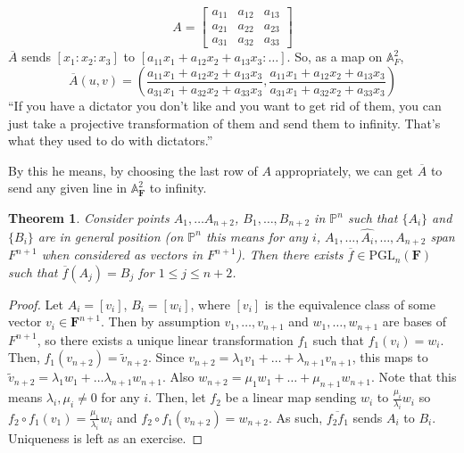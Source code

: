 \documentclass[12pt]{article}
\newcommand{\F}{\mathbf{F}}
\renewcommand{\P}{\mathbb{P}}
\newcommand{\A}{\mathbb{A}}
\newcommand{\PGL}{\mathrm{PGL}}
\newtheorem{theorem}{Theorem}
\begin{document}
    $$A = \begin{bmatrix}
        a_{11} & a_{12} & a_{13} \\
        a_{21} & a_{22} & a_{23} \\
        a_{31} & a_{32} & a_{33}
    \end{bmatrix}$$
    $\overline{A}$ sends $[x_1: x_2: x_3]$ to $[a_{11}x_1 + a_{12}x_2 + a_{13}x_3: \dots]$. So, as a map on $\A_F^2$, 
    $$\overline{A}(u, v) =  \left( \frac{a_{11}x_1 + a_{12}x_2 + a_{13}x_3}{a_{31}x_1 + a_{32}x_2 + a_{33}x_3}, \frac{a_{11}x_1 + a_{12}x_2 + a_{13}x_3}{a_{31}x_1 + a_{32}x_2 + a_{33}x_3}\right)$$
    ``If you have a dictator you don't like and you want to get rid of them, you can just take a projective transformation of them and send them to infinity. That's what they used to do with dictators.'' \par
    By this he means, by choosing the last row of $A$ appropriately, we can get $\overline{A}$ to send any given line in $\A_\F^2$ to infinity. 
    \begin{theorem}
        Consider points $A_1, \dots A_{n+2}$, $B_1, \dots, B_{n+2}$ in $\P^n$ such that $\{A_i\}$ and $\{B_i\}$ are in \textit{general position} (on $\P^n$ this means for any $i$, $A_1, \dots, \hat{A_i}, \dots, A_{n+2}$ span $F^{n+1}$ when considered as vectors in $F^{n+1}$). Then there exists $\overline{f} \in \PGL_n(\F)$ such that $\overline{f}(A_j) = B_j$ for $1 \leq j \leq n+2$. 
    \end{theorem}
    \begin{proof}
        Let $A_i = [v_i]$, $B_i = [w_i]$, where $[v_i]$ is the equivalence class of some vector $v_i \in \F^{n+1}$. Then by assumption $v_1, \dots, v_{n+1}$ and $w_1, \dots, w_{n+1}$ are bases of $F^{n+1}$, so there exists a unique linear transformation $f_1$ such that $f_1(v_i) = w_i$. Then, $f_1(v_{n+2}) = \tilde{v}_{n+2}$. Since $v_{n+2} = \lambda_1v_1 + \dots + \lambda_{n+1}v_{n+1}$, this maps to $\tilde{v}_{n+2} = \lambda_1w_1 + \dots \lambda_{n+1}w_{n+1}$. Also $w_{n+2} = \mu_1w_1 + \dots + \mu_{n+1}w_{n+1}$. Note that this means $\lambda_i, \mu_i \neq 0$ for any $i$. Then, let $f_2$ be a linear map sending $w_i$ to $\frac{\mu_i}{\lambda_i}w_i$ so $f_2 \circ f_1(v_1) = \frac{\mu_1}{\lambda_i}w_i$ and $f_2 \circ f_1(v_{n+2}) = w_{n+2}$. As such, $\overline{f_2f_1}$ sends $A_i$ to $B_i$. Uniqueness is left as an exercise. 
    \end{proof}
\end{document}
